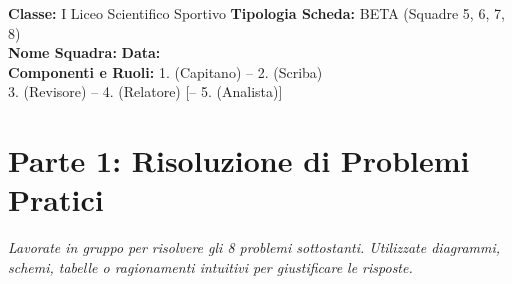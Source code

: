 \documentclass[11pt, a4paper]{article}
\begin{document}
\clearpage


\begin{tcolorbox}[colframe=primary, title=\Large\bfseries SFIDA A SQUADRE: DAI PROBLEMI AGLI INSIEMI -- SQUADRA BETA]
\small
\textbf{Classe:} I Liceo Scientifico Sportivo \hfill \textbf{Tipologia Scheda:} BETA (Squadre 5, 6, 7, 8) \\
\textbf{Nome Squadra:} \dotfill \hfill \textbf{Data:} \dotfill \\
\textbf{Componenti e Ruoli:} 1. \dotfill (Capitano) -- 2. \dotfill (Scriba) \\
3. \dotfill (Revisore) -- 4. \dotfill (Relatore) [-- 5. \dotfill (Analista)]
\end{tcolorbox}

\vspace{-2mm}
\section*{Parte 1: Risoluzione di Problemi Pratici}
\textit{Lavorate in gruppo per risolvere gli 8 problemi sottostanti. Utilizzate diagrammi, schemi, tabelle o ragionamenti intuitivi per giustificare le risposte.}
\end{document}
